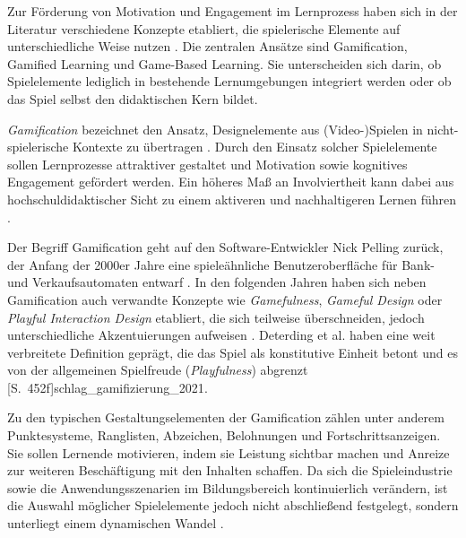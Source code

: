 \iffalse
{}
Zur Förderung von Motivation und Engagement im Lernprozess haben sich in der Literatur verschiedene Konzepte etabliert, die spielerische Elemente auf unterschiedliche Weise nutzen \parencite[S.~485]{triantafyllou_gamification_2025}. Die zentralen Ansätze sind Gamification, Gamified Learning und Game-Based Learning. Sie unterscheiden sich darin, ob Spielelemente lediglich in bestehende Lernumgebungen integriert werden oder ob das Spiel selbst den didaktischen Kern bildet.

\textit{Gamification} bezeichnet den Ansatz, Designelemente aus (Video-)Spielen in nicht-spielerische Kontexte zu übertragen \parencites[S.~2]{deterding_gamification_2011}[S.~9]{kapp_gamification_2012}. Durch den Einsatz solcher Spielelemente sollen Lernprozesse attraktiver gestaltet und Motivation sowie kognitives Engagement gefördert werden. Ein höheres Maß an Involviertheit kann dabei aus hochschuldidaktischer Sicht zu einem aktiveren und nachhaltigeren Lernen führen \parencites[S.~97ff]{chi_active-constructive-interactive_2009}[S.~1821]{chi_translating_2018}.

Der Begriff Gamification geht auf den Software-Entwickler Nick Pelling zurück, der Anfang der 2000er Jahre eine spieleähnliche Benutzeroberfläche für Bank- und Verkaufsautomaten entwarf \parencites{pelling_short_2011}[S.~2f]{deterding_gamification_2011}. In den folgenden Jahren haben sich neben Gamification auch verwandte Konzepte wie \textit{Gamefulness}, \textit{Gameful Design} oder \textit{Playful Interaction Design} etabliert, die sich teilweise überschneiden, jedoch unterschiedliche Akzentuierungen aufweisen \parencite[S.~2f]{deterding_gamification_2011}. Deterding et al. \parencite[S.~2f]{deterding_gamification_2011} haben eine weit verbreitete Definition geprägt, die das Spiel als konstitutive Einheit betont und es von der allgemeinen Spielfreude (\textit{Playfulness}) abgrenzt [S.~452f]{schlag_gamifizierung_2021}.

Zu den typischen Gestaltungselementen der Gamification zählen unter anderem Punktesysteme, Ranglisten, Abzeichen, Belohnungen und Fortschrittsanzeigen. Sie sollen Lernende motivieren, indem sie Leistung sichtbar machen und Anreize zur weiteren Beschäftigung mit den Inhalten schaffen. Da sich die Spieleindustrie sowie die Anwendungsszenarien im Bildungsbereich kontinuierlich verändern, ist die Auswahl möglicher Spielelemente jedoch nicht abschließend festgelegt, sondern unterliegt einem dynamischen Wandel \parencite[S.~2f]{hamari_does_2014}.

